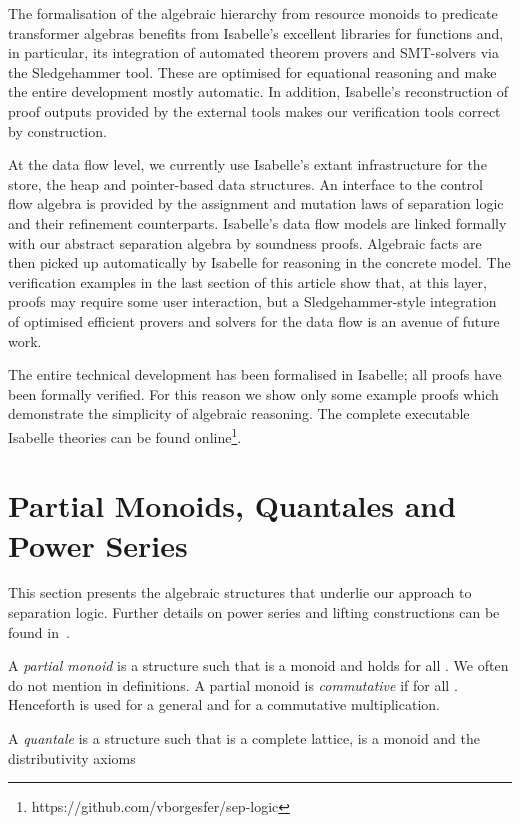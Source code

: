 \documentclass[twoside,runningheads,envcountsame,envcountsect,oribibl,orivec]{llncs}
\begin{document}
The formalisation of the algebraic hierarchy from resource monoids to
predicate transformer algebras benefits from Isabelle's excellent
libraries for functions and, in particular, its integration of
automated theorem provers and SMT-solvers via the Sledgehammer tool.
These are optimised for equational reasoning and make the entire
development mostly automatic. In addition, Isabelle's reconstruction
of proof outputs provided by the external tools makes our verification
tools correct by construction.

At the data flow level, we currently use Isabelle's extant
infrastructure for the store, the heap and pointer-based data
structures. An interface to the control flow algebra is provided by
the assignment and mutation laws of separation logic and their
refinement counterparts. Isabelle's data flow models are linked
formally with our abstract separation algebra by soundness
proofs. Algebraic facts are then picked up automatically by Isabelle
for reasoning in the concrete model. The verification examples in the
last section of this article show that, at this layer, proofs may
require some user interaction, but a Sledgehammer-style integration of
optimised efficient provers and solvers for the data flow is an avenue
of future work.

The entire technical development has been formalised in Isabelle; all
proofs have been formally verified.  For this reason we show only some
example proofs which demonstrate the simplicity of algebraic
reasoning. The complete executable Isabelle theories can be found
online\footnote{https://github.com/vborgesfer/sep-logic}.



\section{Partial Monoids, Quantales and Power
  Series} \label{S:preliminaries}

This section presents the algebraic structures that underlie our
approach to separation logic. Further details on power series and
lifting constructions can be found in~\cite{DHS14}.

A \emph{partial monoid} is a structure  such that
 is a monoid and  holds
for all .  We often do not mention  in
definitions. A partial monoid  is \emph{commutative} if  for all . Henceforth  is used for a
general and  for a commutative multiplication.

A \emph{quantale} is a structure  such that 
is a complete lattice,  is a monoid and the distributivity
axioms
\end{document}
